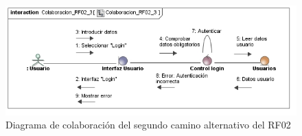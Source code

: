 \begin{itemize}
\begin{figure} [!htb]
	\end{figure}
	\begin{figure} [!htb]
		\centering
		\includegraphics[width=\linewidth,height=\textheight,keepaspectratio]{Images/Diagramas/04_Colaboracion_RF02_3}
		\caption{Diagrama de colaboración del segundo camino alternativo del RF02}
		\label{fig:diagramaColaboracion_RF02_3}
	\end{figure}
	

\end{itemize}
